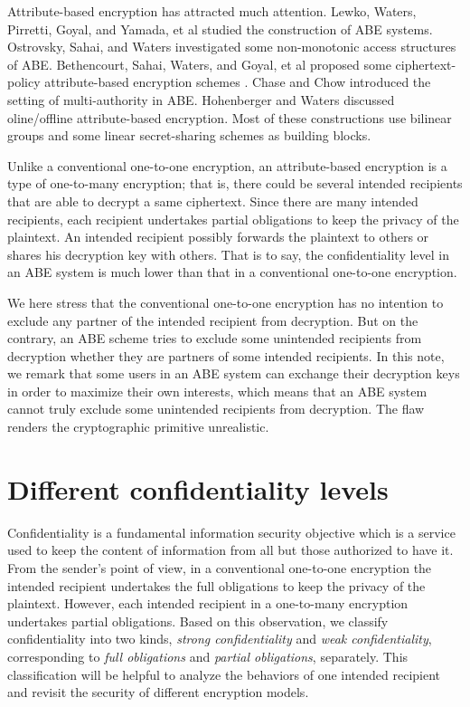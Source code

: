 \documentclass[11pt]{article}
\begin{document}
Attribute-based encryption has attracted much attention. Lewko, Waters, Pirretti, Goyal, and Yamada, et al \cite{AHL12,GPSW06,LOS10,LWa11,LW11,LW12,PTMW06,YAH14} studied the construction of  ABE systems. Ostrovsky,  Sahai, and   Waters \cite{OSW07} investigated some non-monotonic access structures of ABE.
 Bethencourt, Sahai,  Waters, and Goyal, et al proposed some ciphertext-policy attribute-based encryption schemes \cite{BSW07,GJP08,W11}.
 Chase and Chow  \cite{CC09,Ch07} introduced the setting of multi-authority in ABE.  Hohenberger and Waters  \cite{HW14} discussed oline/offline attribute-based encryption.
Most of these constructions use bilinear groups and some linear secret-sharing schemes as building blocks.


 Unlike a conventional one-to-one encryption, an attribute-based encryption is a type of one-to-many encryption; that is, there could
be several intended recipients that are able to decrypt a same ciphertext. Since there are many intended recipients, each recipient undertakes partial obligations to
keep the privacy of the plaintext.
An intended recipient possibly forwards the plaintext to others or shares his decryption key with others.
That is to say,  the confidentiality level in an ABE system is much lower than that in a conventional one-to-one encryption.


We here  stress that the conventional one-to-one encryption  has no intention to exclude any partner of the intended recipient from decryption. But on the contrary,
an ABE scheme tries to exclude some unintended recipients from decryption whether they are partners of some intended recipients.
In this note, we remark that some users in an ABE system can exchange their decryption keys in order to maximize their own interests, which means
that an ABE system cannot truly exclude some unintended recipients from decryption. The flaw renders the cryptographic primitive unrealistic.

\section{Different confidentiality levels}

Confidentiality is a fundamental information security objective which is a  service used to keep the content of information from all but those
authorized to have it. From the sender's point of view, in a conventional one-to-one encryption the intended recipient  undertakes the full obligations to keep the privacy of the plaintext.
However, each intended recipient in a one-to-many encryption undertakes partial obligations. Based on this observation, we classify confidentiality into two kinds, \emph{strong confidentiality} and \emph{weak confidentiality}, corresponding to \emph{full obligations} and \emph{partial obligations}, separately.
This classification will be helpful to analyze the behaviors of one intended recipient and revisit the security of different encryption models.
\end{document}
